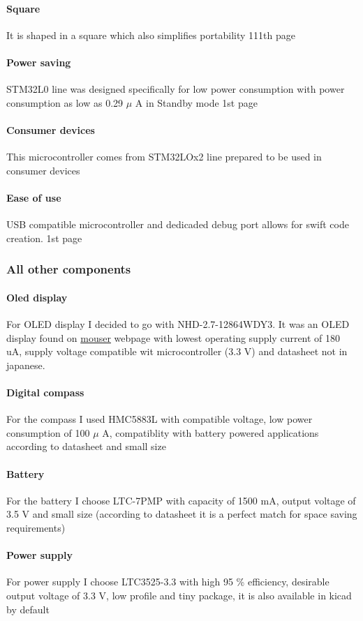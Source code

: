 \documentclass{article}
\begin{document}
\paragraph{Square} It is shaped in a square which also simplifies portability
\cite{datasheet} 111th page
\paragraph{Power saving} STM32L0 line was designed specifically for low power
consumption with power consumption as low as 0.29 $\mu$ A in Standby mode
\cite{datasheet} 1st page
\paragraph{Consumer devices} This microcontroller comes from STM32LOx2 line
prepared to be used in consumer devices \cite{consumerDevice}
\paragraph{Ease of use} USB compatible microcontroller and dedicaded debug port
allows for swift code creation.
\cite{datasheet} 1st page 
\subsubsection{All other components}
\paragraph{Oled display} For OLED display I decided to go with
NHD-2.7-12864WDY3. It was an OLED display found on \href{www.mouser.pl}{mouser}
webpage with lowest operating supply current of 180 uA, supply voltage
compatible wit microcontroller (3.3 V) and datasheet not in japanese.
\cite{OLED}
\paragraph{Digital compass} For the compass I used HMC5883L with compatible
voltage, low power consumption of 100 $\mu$ A, compatiblity with battery powered
applications according to datasheet and small size 
\paragraph{Battery} For the battery I choose LTC-7PMP with capacity of 1500 mA,
output voltage of 3.5 V and small size (according to datasheet it is a perfect
match for space saving requirements) \cite{Battery}
\paragraph{Power supply} For power supply I choose LTC3525-3.3 with high 95 \%
efficiency, desirable output voltage of 3.3 V, low profile and tiny package, it
is also available in kicad by default \cite{Power supply}
\end{document}
